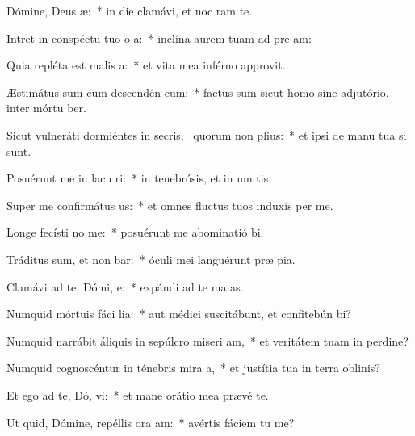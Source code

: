 \item Dómine, Deus  æ:~* in die clamávi, et noc ram te.
\item Intret in conspéctu tuo o a:~* inclína aurem tuam ad pre am:
\item Quia repléta est malis  a:~* et vita mea inférno approvit.
\item Æstimátus sum cum descendén  cum:~* factus sum sicut homo sine adjutório, inter mórtu ber.
\item Sicut vulneráti dormiéntes in secris,~\pscross{} quorum non   plius:~* et ipsi de manu tua si sunt.
\item Posuérunt me in lacu ri:~* in tenebrósis, et in um tis.
\item Super me confirmátus   us:~* et omnes fluctus tuos induxís per me.
\item Longe fecísti no   me:~* posuérunt me abominatió bi.
\item Tráditus sum, et non bar:~* óculi mei languérunt præ pia.
\item Clamávi ad te, Dómi,  e:~* expándi ad te ma as.
\item Numquid mórtuis fáci lia:~* aut médici suscitábunt, et confitebún bi?
\item Numquid narrábit áliquis in sepúlcro miseri am,~* et veritátem tuam in perdine?
\item Numquid cognoscéntur in ténebris mira a,~* et justítia tua in terra oblinis?
\item Et ego ad te, Dó, vi:~* et mane orátio mea prævé te.
\item Ut quid, Dómine, repéllis ora am:~* avértis fáciem tu  me?
